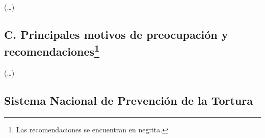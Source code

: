\documentclass[10pt,twoside,spanish,a5paper,]{book}
\begin{document}
(\ldots{})

\hypertarget{c.-principales-motivos-de-preocupaciuxf3n-y-recomendaciones51}{%
\subsection[C. Principales motivos de preocupación y
recomendaciones]{\texorpdfstring{C. Principales motivos de preocupación
y recomendaciones\footnote{Las recomendaciones se encuentran en negrita.}}{C. Principales motivos de preocupación y recomendaciones}}\label{c.-principales-motivos-de-preocupaciuxf3n-y-recomendaciones51}}

(\ldots{})

\hypertarget{sistema-nacional-de-prevenciuxf3n-de-la-tortura}{%
\subsection{Sistema Nacional de Prevención de la
Tortura}\label{sistema-nacional-de-prevenciuxf3n-de-la-tortura}}
\end{document}
